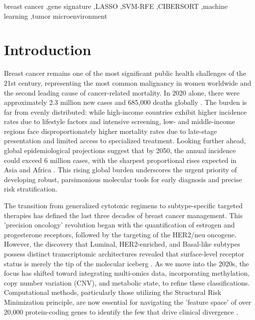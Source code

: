\documentclass[a4paper,fleqn]{cas-sc}
\begin{document}
\begin{keywords}
 breast cancer \sep gene signature \sep LASSO \sep SVM-RFE \sep CIBERSORT \sep machine learning \sep tumor microenvironment
\end{keywords}

\maketitle
\doublespacing
\linenumbers

\section{Introduction}

Breast cancer remains one of the most significant public health challenges of the 21st century, representing the most common malignancy in women worldwide and the second leading cause of cancer-related mortality. In 2020 alone, there were approximately 2.3 million new cases and 685,000 deaths globally \citep{sung2021}. The burden is far from evenly distributed: while high-income countries exhibit higher incidence rates due to lifestyle factors and intensive screening, low- and middle-income regions face disproportionately higher mortality rates due to late-stage presentation and limited access to specialized treatment. Looking further ahead, global epidemiological projections suggest that by 2050, the annual incidence could exceed 6 million cases, with the sharpest proportional rises expected in Asia and Africa \citep{yousefi2025}. This rising global burden underscores the urgent priority of developing robust, parsimonious molecular tools for early diagnosis and precise risk stratification.

The transition from generalized cytotoxic regimens to subtype-specific targeted therapies has defined the last three decades of breast cancer management. This 'precision oncology' revolution began with the quantification of estrogen and progesterone receptors, followed by the targeting of the HER2/neu oncogene. However, the discovery that Luminal, HER2-enriched, and Basal-like subtypes possess distinct transcriptomic architectures revealed that surface-level receptor status is merely the tip of the molecular iceberg \citep{perou2000}. As we move into the 2020s, the focus has shifted toward integrating multi-omics data, incorporating methylation, copy number variation (CNV), and metabolic state, to refine these classifications. Computational methods, particularly those utilizing the Structural Risk Minimization principle, are now essential for navigating the 'feature space' of over 20,000 protein-coding genes to identify the few that drive clinical divergence \citep{statnikov2005, libbrecht2015}.
\end{document}
